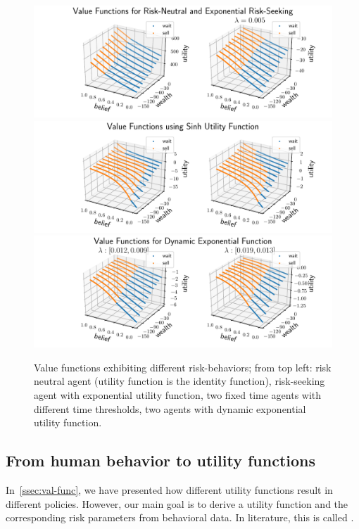 \begin{figure}[h]
    \centering
    \includegraphics[width=0.99\linewidth]{img/exp_policy.pdf}\\
    \includegraphics[width=0.99\linewidth]{img/sinh_policy.pdf}\\
    \includegraphics[width=0.99\linewidth]{img/dyn_policy.pdf}
    \caption{Value functions exhibiting different risk-behaviors; from top left: risk neutral agent (utility function is the identity function), risk-seeking agent with exponential utility function, two fixed time agents with different time thresholds, two agents with dynamic exponential utility function.}\label{fig:val-func}
\end{figure}

\subsection{From human behavior to utility functions}\label{ssec:human-behavior}

In~\autoref{ssec:val-func}, we have presented how different utility functions result in different policies.
However, our main goal is to derive a utility function and the corresponding risk parameters from behavioral data.
In literature, this is called  \cite{TODO}.

